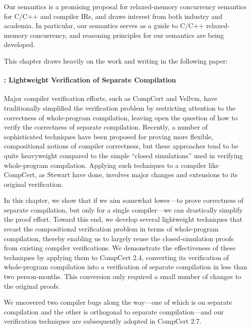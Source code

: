   Our semantics is a promising proposal for relaxed-memory concurrency
semantics for C/C++ and compiler IRs, and draws interest from both industry and academia.  In
particular, our semantics serves as a guide to C/C++ relaxed-memory concurrency, and reasoning
principles for our semantics are being developed.

This chapter draws heavily on the work and writing in the following paper:



\paragraph{: Lightweight Verification of Separate Compilation}

Major compiler verification efforts, such as CompCert and Vellvm, have traditionally simplified the
verification problem by restricting attention to the correctness of whole-program compilation,
leaving open the question of how to verify the correctness of separate compilation.  Recently, a
number of sophisticated techniques have been proposed for proving more flexible, compositional
notions of compiler correctness, but these approaches tend to be quite heavyweight compared to the
simple ``closed simulations'' used in verifying whole-program compilation.  Applying such techniques
to a compiler like CompCert, as Stewart \etal{} have done, involves major changes and extensions to
its original verification.

In this chapter, we show that if we aim somewhat lower---to prove correctness of separate
compilation, but only for a single compiler---we can drastically simplify the proof effort.  Toward
this end, we develop several lightweight techniques that recast the compositional verification
problem in terms of whole-program compilation, thereby enabling us to largely reuse the
closed-simulation proofs from existing compiler verifications.  We demonstrate the effectiveness of
these techniques by applying them to CompCert 2.4, converting its verification of whole-program
compilation into a verification of separate compilation in less than two person-months.  This
conversion only required a small number of changes to the original proofs.

We uncovered two compiler bugs along the way---one of which is on separate compilation and the other
is orthogonal to separate compilation---and our verification techniques are subsequently adopted in
CompCert 2.7.

